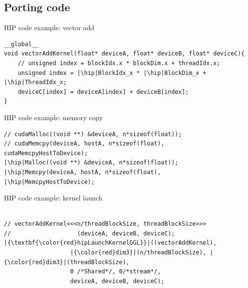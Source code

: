 \documentclass[aspectratio=169]{beamer}
\newcommand{\hip}{\textbf{\color{red}{hip}}}
\begin{document}
\subsection{Porting code}
\begin{frame}[fragile]{HIP code example: vector add}
\begin{verbatim}
__global__
void vectorAddKernel(float* deviceA, float* deviceB, float* deviceC){
    // unsigned index = blockIdx.x * blockDim.x + threadIdx.x;
    unsigned index = |\hip|BlockIdx_x * |\hip|BlockDim_x + |\hip|ThreadIdx_x;
    deviceC[index] = deviceA[index] + deviceB[index];
}
\end{verbatim}
\end{frame}

\begin{frame}[fragile]{HIP code example: memory copy}


\begin{verbatim}
// cudaMalloc((void **) &deviceA, n*sizeof(float));
// cudaMemcpy(deviceA, hostA, n*sizeof(float), cudaMemcpyHostToDevice);
|\hip|Malloc((void **) &deviceA, n*sizeof(float));
|\hip|Memcpy(deviceA, hostA, n*sizeof(float), |\hip|MemcpyHostToDevice);
\end{verbatim}
\end{frame}

\begin{frame}[fragile]{HIP code example: kernel launch}

\begin{verbatim}

// vectorAddKernel<<<n/threadBlockSize, threadBlockSize>>>
//                   (deviceA, deviceB, deviceC);
|{\textbf{\color{red}hipLaunchKernelGGL}}|((vectorAddKernel), 
                   |{\color{red}dim3}|(n/threadBlockSize), |{\color{red}dim3}|(threadBlockSize),
                   0 /*Shared*/, 0/*stream*/,
                   deviceA, deviceB, deviceC);
\end{verbatim}
\end{frame}
\end{document}
